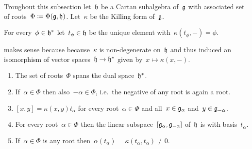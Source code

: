 \begin{convention}
  Troughout this subsection let~$\mathfrak{h}$ be a Cartan subalgebra of~$\mathfrak{g}$ with associated set of roots~$\Phi \coloneqq \Phi(\mathfrak{g},\mathfrak{h})$.
  Let~$\kappa$ be the Killing form of~$\mathfrak{g}$.
\end{convention}


\begin{definition}
  \label{def of t_phi}
  For every~$\phi \in \mathfrak{h}^*$ let~$t_\phi \in \mathfrak{h}$ be the unique element with~$\kappa(t_{\phi}, -) = \phi$.
\end{definition}


\begin{remark}
   makes sense because because~$\kappa$ is non-degenerate on~$\mathfrak{h}$ and thus induced an isomorphism of vector spaces~$\mathfrak{h} \to \mathfrak{h}^*$ given by~$x \mapsto \kappa(x,-)$.
\end{remark}


\begin{proposition}
  \label{basics properties of roots}
  \leavevmode
  \begin{enumerate}
    \item 
      The set of roots~$\Phi$ spans the dual space~$\mathfrak{h}^*$.
    \item
      If~$\alpha \in \Phi$ then also~$-\alpha \in \Phi$, i.e.\ the negative of any root is again a root.
    \item
      \label{bracket via kappa}
      $[x,y] = \kappa(x,y) t_\alpha$ for every root~$\alpha \in \Phi$ and all~$x \in \mathfrak{g}_\alpha$ and~$y \in \mathfrak{g}_{-\alpha}$.
    \item
      For every root~$\alpha \in \Phi$ then the linear subspace~$[\mathfrak{g}_\alpha, \mathfrak{g}_{-\alpha}]$ of~$\mathfrak{h}$ is {\onedimensional} with basis~$t_\alpha$.
    \item
      If~$\alpha \in \Phi$ is any root then~$\alpha(t_\alpha) = \kappa(t_\alpha, t_\alpha) \neq 0$.
  \end{enumerate}
\end{proposition}


